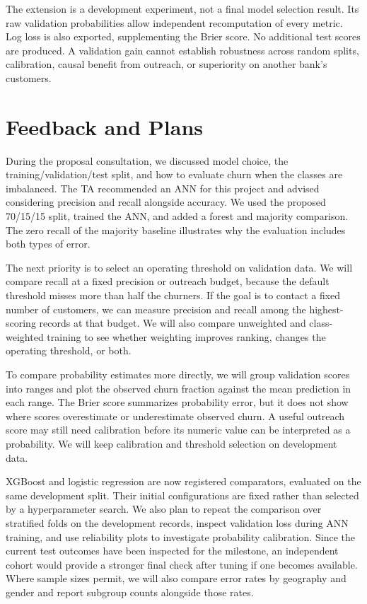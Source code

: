 \documentclass[11pt]{article}
\begin{document}


The extension is a development experiment, not a final model selection result. Its raw validation probabilities allow independent recomputation of every metric. Log loss is also exported, supplementing the Brier score. No additional test scores are produced. A validation gain cannot establish robustness across random splits, calibration, causal benefit from outreach, or superiority on another bank's customers.

\section{Feedback and Plans}

During the proposal consultation, we discussed model choice, the training/validation/test split, and how to evaluate churn when the classes are imbalanced. The TA recommended an ANN for this project and advised considering precision and recall alongside accuracy. We used the proposed 70/15/15 split, trained the ANN, and added a forest and majority comparison. The zero recall of the majority baseline illustrates why the evaluation includes both types of error.

The next priority is to select an operating threshold on validation data. We will compare recall at a fixed precision or outreach budget, because the default threshold misses more than half the churners. If the goal is to contact a fixed number of customers, we can measure precision and recall among the highest-scoring records at that budget. We will also compare unweighted and class-weighted training to see whether weighting improves ranking, changes the operating threshold, or both.

To compare probability estimates more directly, we will group validation scores into ranges and plot the observed churn fraction against the mean prediction in each range. The Brier score summarizes probability error, but it does not show where scores overestimate or underestimate observed churn. A useful outreach score may still need calibration before its numeric value can be interpreted as a probability. We will keep calibration and threshold selection on development data.

XGBoost \citep{chen2016} and logistic regression are now registered comparators, evaluated on the same development split. Their initial configurations are fixed rather than selected by a hyperparameter search. We also plan to repeat the comparison over stratified folds on the development records, inspect validation loss during ANN training, and use reliability plots to investigate probability calibration. Since the current test outcomes have been inspected for the milestone, an independent cohort would provide a stronger final check after tuning if one becomes available. Where sample sizes permit, we will also compare error rates by geography and gender and report subgroup counts alongside those rates.
\end{document}

